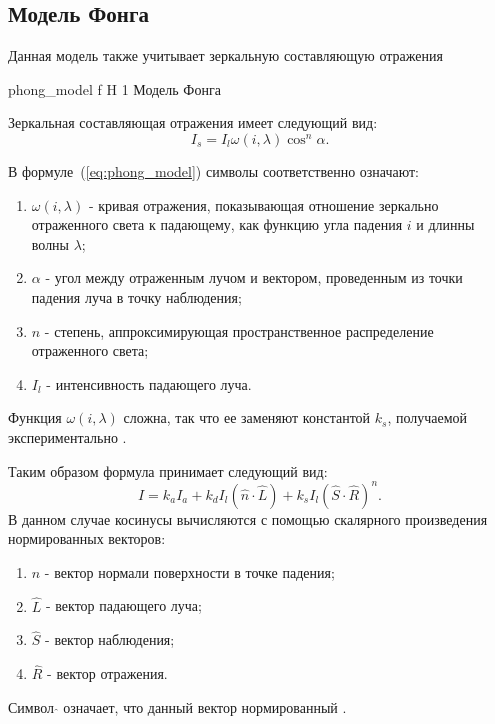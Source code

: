 \subsection{Модель Фонга}
Данная модель также учитывает зеркальную составляющую отражения


{phong_model} %
{f} %
{H} %
{1\textwidth} %
{Модель Фонга} %



Зеркальная составляющая отражения имеет следующий вид:
\begin{equation} 
	I_s = I_l\omega(i,\lambda)\cos^n \alpha.
	\label{eq:phong_model}
\end{equation}

В формуле~(\ref{eq:phong_model}) символы соответственно означают:
\begin{enumerate} 
	\item $\omega(i,\lambda)$ - кривая отражения, показывающая отношение зеркально отраженного света к падающему, как функцию угла падения $i$ и длинны волны $\lambda$;
	\item $\alpha$ - угол между отраженным лучом и вектором, проведенным из точки падения луча в точку наблюдения;
	\item $n$ - степень, аппроксимирующая пространственное распределение отраженного света;
	\item $I_l$ - интенсивность падающего луча.
\end{enumerate}
Функция $\omega(i,\lambda)$ сложна, так что ее заменяют константой $k_s$, получаемой экспериментально \cite{Rodgers}.


Таким образом формула принимает следующий вид:
\begin{equation} 
	I = k_aI_a + k_dI_{l}(\hat{n} \cdot \hat{L}) + k_s  I_{l}(\hat{S} \cdot \hat{R})^n.
\end{equation}
В данном случае косинусы вычисляются с помощью скалярного произведения нормированных векторов:
\begin{enumerate}
	\item $\hat{n}$ - вектор нормали поверхности в точке падения;
	\item $\hat{L}$ - вектор падающего луча;
	\item $\hat{S}$ - вектор наблюдения;
	\item $\hat{R}$ - вектор отражения.
\end{enumerate}
Символ $\hat{}$ означает, что данный вектор нормированный \cite{Rodgers}.





